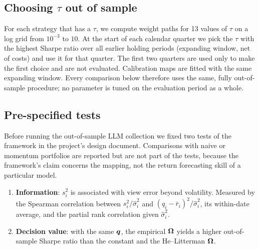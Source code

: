 \subsection{Choosing \texorpdfstring{$\tau$}{tau} out of sample}\label{sec:tau}
For each strategy that has a $\tau$, we compute weight paths for 13 values of $\tau$ on a log grid from $10^{-3}$ to $10$. At the start of each calendar quarter we pick the $\tau$ with the highest Sharpe ratio over all earlier holding periods (expanding window, net of costs) and use it for that quarter. The first two quarters are used only to make the first choice and are not evaluated. Calibration maps are fitted with the same expanding window. Every comparison below therefore uses the same, fully out-of-sample procedure; no parameter is tuned on the evaluation period as a whole.

\subsection{Pre-specified tests}\label{sec:criteria}
Before running the out-of-sample LLM collection we fixed two tests of the framework in the project's design document. Comparisons with naive or momentum portfolios are reported but are not part of the tests, because the framework's claim concerns the mapping, not the return forecasting skill of a particular model.
\begin{enumerate}
  \item[(a)] \textbf{Information}: $s_i^2$ is associated with view error beyond volatility. Measured by the Spearman correlation between $s_i^2/\hat\sigma_i^2$ and $(q_i-\bar r_i)^2/\hat\sigma_i^2$, its within-date average, and the partial rank correlation given $\hat\sigma_i^2$.
  \item[(b)] \textbf{Decision value}: with the same $\bm{q}$, the empirical $\bm{\Omega}$ yields a higher out-of-sample Sharpe ratio than the constant and the He--Litterman $\bm{\Omega}$.
\end{enumerate}
